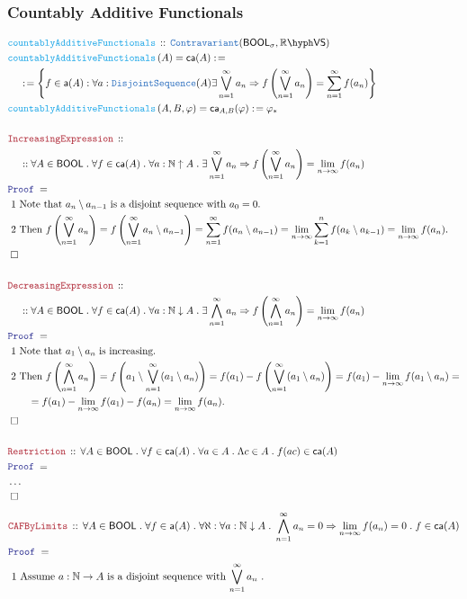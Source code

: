 \documentclass[12pt]{scrartcl}
\newcommand{\TYPE}[1]{\textcolor{NavyBlue}{\mathtt{#1}}}
\newcommand{\FUNC}[1]{\textcolor{Cerulean}{\mathtt{#1}}}
\newcommand{\LOGIC}[1]{\textcolor{Blue}{\mathtt{#1}}}
\newcommand{\THM}[1]{\textcolor{Maroon}{\mathtt{#1}}}
\renewcommand{\.}{\; . \;}
\newcommand{\de}{: \kern 0.1pc =}
\newcommand{\Act}[1]{\left( #1 \right)}
\newcommand{\Theorem}[2]{& \THM{#1} \, :: \, #2 \\ & \Proof = \\ }
\newcommand{\DeclareFunc}[2]{& \FUNC{#1} \, :: \, #2 \\}
\newcommand{\DefineNamedFunc}[4]{&  \FUNC{#1}\Act{#2} = #3 \de #4 \\}
\newcommand{\NewLine}{\\ & \kern 1pc}
\newcommand{\Page}[1]{ \begin{align*} #1 \end{align*}   }
\newcommand{\NoProof}{ & \ldots \\ \EndProof}
\newcommand{\Imply}{\Rightarrow}
\newcommand{\Reals}{\mathbb{R} }
\newcommand{\Nat}{\mathbb{N} }
\newcommand{\QED}{\; \square}
\newcommand{\EndProof}{& \QED \\}
\newcommand{\Proof}{\LOGIC{Proof} \; }
\newcommand{\Explain}[1]{& \text{#1.} \\}
\newcommand{\ExplainFurther}[1]{& \text{#1} \\}
\newcommand{\Contra}{\TYPE{Contravariant}}
\newcommand{\BOOL}{\mathsf{BOOL}}
\newcommand{\VS}[1]{#1\hyph\mathsf{VS}} %
\newcommand{\caf}{\mathsf{ca}}
\newcommand{\af}{\mathsf{a}}
\begin{document}
\subsubsection{Countably Additive Functionals}
\Page{
	\DeclareFunc{countablyAdditiveFunctionals}
	{
		\Contra(\BOOL_\sigma, \VS{\Reals})
	}
	\DefineNamedFunc{countablyAdditiveFunctionals}{A}{\caf(A)}
	{
		\NewLine \de
		\left\{ 
			f \in \af(A) : \forall a : \TYPE{DisjointSequence}(A) 
			\exists \bigvee^\infty_{n=1} a_n \Imply
			f\left(\bigvee^\infty_{n=1} a_n\right) = \sum^\infty_{n=1} f(a_n)  
		\right\} 
	}
	\DefineNamedFunc{countablyAdditiveFunctionals}{A,B,\varphi}{\caf_{A,B}(\varphi)}
	{
		\varphi_*
	}
	\\
	\Theorem{IncreasingExpression}
	{
		\NewLine ::		
		\forall A \in \BOOL \.
		\forall f \in \caf(A) \.
		\forall a : \Nat \uparrow A \.
		\exists \bigvee^\infty_{n=1} a_n 
		\Imply
		f\left( \bigvee^\infty_{n=1} a_n \right) = \lim_{n \to \infty} f(a_n)
	}
	\Explain{ 1 Note that $a_{n} \setminus a_{n-1}$ is a disjoint sequence
		with $a_0 = 0$}
	\Explain{ 2 Then 
		$
		f\left( \bigvee^\infty_{n=1} a_n \right)  =
		f\left( \bigvee^\infty_{n=1} a_n \setminus a_{n-1} \right) = 
		\sum^\infty_{n=1} f(a_n \setminus a_{n-1})  =
		\lim_{n \to \infty} \sum^n_{k=1} f(a_k \setminus a_{k-1}) =
		\lim_{n \to \infty} f(a_n)
		$}
	\EndProof
	\\
	\Theorem{DecreasingExpression}
	{
		\NewLine ::		
		\forall A \in \BOOL \.
		\forall f \in \caf(A) \.
		\forall a : \Nat \downarrow A \.
		\exists \bigwedge^\infty_{n=1} a_n 
		\Imply
		f\left( \bigwedge^\infty_{n=1} a_n \right) = \lim_{n \to \infty} f(a_n)
	}
	\Explain{ 1 Note that $a_{1} \setminus a_{n}$ is increasing}
	\ExplainFurther{ 2 Then 
		$
		f\left(\bigwedge^\infty_{n=1} a_n \right)  =
		f\left(a_1 \setminus \bigvee^\infty_{n=1} (a_1 \setminus a_n) \right)= 
		f(a_1) -  f\left(\bigvee^\infty_{n=1} (a_1 \setminus a_n)\right) = 
		f(a_1) - \lim_{n \to \infty} f(a_1 \setminus a_n) = $}
	\Explain{ $ \quad \quad =
		f(a_1) - \lim_{n \to \infty} f(a_1) - f(a_n) = 
		\lim_{n \to \infty} f(a_n) $}
	\EndProof
	\\	
	\Theorem{Restriction}
	{
		\forall A \in \BOOL \.
		\forall f \in \caf(A) \.
		\forall a \in A \.
		\Lambda c \in A \. f(ac)  \in \caf(A)
	}
	\NoProof
} \Page{
	\Theorem{CAFByLimits}
	{
		\forall A \in \BOOL \. 
		\forall f \in \af(A) \.
		\forall \aleph : \forall a : \Nat \downarrow A \. 
		\bigwedge_{n=1}^\infty a_n = 0 \Imply \lim_{n\to\infty} f(a_n) = 0 \.
		f \in \caf(A)
	}
	\Explain{ 1 Assume $a : \Nat \to A$ is a disjoint sequence with $\bigvee^\infty_{n=1} a_n$
}}
\end{document}
